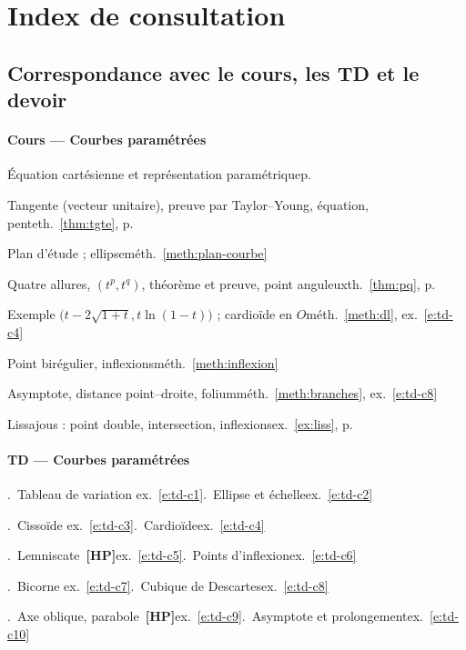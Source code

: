 \documentclass[a4paper,11pt]{article}
\numberwithin{equation}{section}
\numberwithin{figure}{section}
\numberwithin{table}{section}
\theoremstyle{enonce}
\theoremstyle{exemple}
\theoremstyle{remarque}
\newif\ifonglets \ongletsfalse
\newcommand{\HP}{\,{\sffamily\bfseries\scriptsize\textcolor{Brique}{[HP]}}}
\begin{document}
\clearpage
\ongletsfalse
\section*{Index de consultation}\label{sec:index}

\subsection*{Correspondance avec le cours, les TD et le devoir}\label{sec:corresp}
{\footnotesize
\paragraph{Cours --- Courbes paramétrées}
\noindent Équation cartésienne et représentation paramétrique\dotfill p.~\pageref{sec:courbes}\par
\noindent Tangente (vecteur unitaire), preuve par Taylor--Young, équation, pente\dotfill th.~\ref{thm:tgte}, p.~\pageref{thm:tgte}\par
\noindent Plan d'étude ; ellipse\dotfill méth.~\ref{meth:plan-courbe}\par
\noindent Quatre allures, $(t^p,t^q)$, théorème et preuve, point anguleux\dotfill th.~\ref{thm:pq}, p.~\pageref{thm:pq}\par
\noindent Exemple $\big(t-2\sqrt{1+t},t\ln(1-t)\big)$ ; cardioïde en $O$\dotfill méth.~\ref{meth:dl}, ex.~\ref{e:td-c4}\par
\noindent Point birégulier, inflexions\dotfill méth.~\ref{meth:inflexion}\par
\noindent Asymptote, distance point--droite, folium\dotfill méth.~\ref{meth:branches}, ex.~\ref{e:td-c8}\par
\noindent Lissajous : point double, intersection, inflexions\dotfill ex.~\ref{ex:liss}, p.~\pageref{ex:liss}\par
\paragraph{TD --- Courbes paramétrées}
.~Tableau de variation \dotfill ex.~\ref{e:td-c1}.~Ellipse et échelle\dotfill ex.~\ref{e:td-c2}\par
{}.~Cissoïde \dotfill ex.~\ref{e:td-c3}.~Cardioïde\dotfill ex.~\ref{e:td-c4}\par
{}.~Lemniscate \HP\dotfill ex.~\ref{e:td-c5}.~Points d'inflexion\dotfill ex.~\ref{e:td-c6}\par
{}.~Bicorne \dotfill ex.~\ref{e:td-c7}.~Cubique de Descartes\dotfill ex.~\ref{e:td-c8}\par
{}.~Axe oblique, parabole \HP\dotfill ex.~\ref{e:td-c9}.~Asymptote et prolongement\dotfill ex.~\ref{e:td-c10}\par
}
\end{document}
